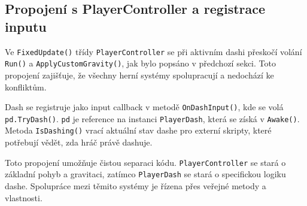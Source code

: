 \subsection{Propojení s PlayerController a registrace inputu}

Ve \texttt{FixedUpdate()} třídy \texttt{PlayerController} se při aktivním dashi přeskočí volání \texttt{Run()} a \texttt{ApplyCustomGravity()}, jak bylo popsáno v předchozí sekci. Toto propojení zajišťuje, že všechny herní systémy spolupracují a nedochází ke konfliktům.

Dash se registruje jako input callback v metodě \texttt{OnDashInput()}, kde se volá \texttt{pd.TryDash()}. \texttt{pd} je reference na instanci \texttt{PlayerDash}, která se získá v \texttt{Awake()}. Metoda \texttt{IsDashing()} vrací aktuální stav dashe pro externí skripty, které potřebují vědět, zda hráč právě dashuje.

Toto propojení umožňuje čistou separaci kódu. \texttt{PlayerController} se stará o základní pohyb a gravitaci, zatímco \texttt{PlayerDash} se stará o specifickou logiku dashe. Spolupráce mezi těmito systémy je řízena přes veřejné metody a vlastnosti.